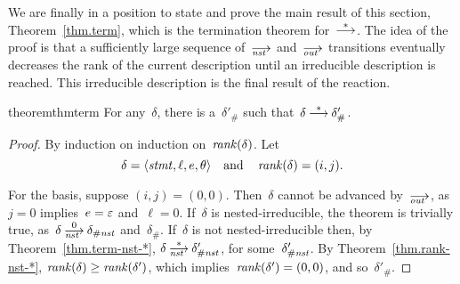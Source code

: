 We are finally in a position to state and prove the main result of this
section, Theorem~\ref{thm.term}, which is the termination theorem
for~$\trans[*]$.  The idea of the proof is that a sufficiently large
sequence of~$\nst$ and~$\out$ transitions eventually decreases the rank of
the current description until an irreducible description is reached.  This
irreducible description is the final result of the reaction.
\begin{restatable}[Termination]{theorem}{thmterm}
  \label{thm.term}
  For any~$\delta$, there is a~$\delta'_\#$ such
  that~$\delta\trans[*]\delta'_\#$.
\end{restatable}
\begin{proof}
  By induction on induction on~$\operatorname{\mathit{rank}}(\delta)$.
  Let
  \[
    \delta=\<\stmt,\ell,e,\theta>
    \quad\text{and}\quad
    \rank(\delta)=(i,j).
  \]

  For the basis, suppose $(i,j)=(0,0)$.  Then~$\delta$ cannot be advanced
  by~$\out$, as~$j=0$ implies~$e=\varepsilon$ and~$\ell=0$.  If~$\delta$ is
  nested-irreducible, the theorem is trivially true,
  as~$\delta\nst[0]\delta_\Hnst$ and~$\delta_\#$.  If~$\delta$ is not
  nested-irreducible then, by Theorem~\ref{thm.term-nst-*},
  $\delta\nst[*]\delta'_\Hnst$, for some~$\delta'_{\#\mathit{nst}}$.  By
  Theorem~\ref{thm.rank-nst-*}, $\operatorname{\mathit{rank}}(\delta)\ge\operatorname{\mathit{rank}}(\delta')$, which
  implies~$\operatorname{\mathit{rank}}(\delta')=(0,0)$, and so~$\delta'_\#$.


\end{proof}
